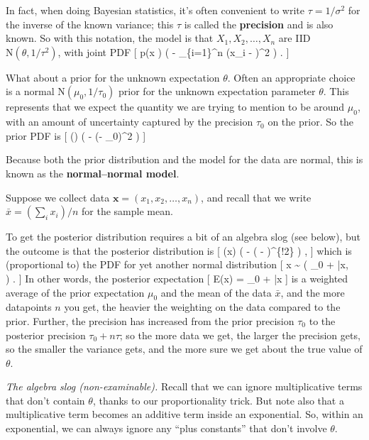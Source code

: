 \documentclass[
  letterpaper,
]{report}
\theoremstyle{definition}
\theoremstyle{definition}
\theoremstyle{remark}
\begin{document}
In fact, when doing Bayesian statistics, it's often convenient to write
\(\tau = 1/\sigma^2\) for the inverse of the known variance; this
\(\tau\) is called the \textbf{precision} and is also known. So with
this notation, the model is that \(X_1, X_2, \dots, X_n\) are IID
\(\text{N}(\theta, 1 / \tau^2)\), with joint PDF {[} p(\mathbf x
\mid \theta) \propto \exp \left( -  \sum\_\{i=1\}\^{}n
(x\_i - \theta)\^{}2 \right) . {]}

What about a prior for the unknown expectation \(\theta\). Often an
appropriate choice is a normal \(\text{N}(\mu_0, 1/\tau_0)\) prior for
the unknown expectation parameter \(\theta\). This represents that we
expect the quantity we are trying to mention to be around \(\mu_0\),
with an amount of uncertainty captured by the precision \(\tau_0\) on
the prior. So the prior PDF is {[} \pi(\theta) \propto \exp \left( -
 (\theta - \mu\_0)\^{}2 \right) {]}

Because both the prior distribution and the model for the data are
normal, this is known as the \textbf{normal--normal model}.

Suppose we collect data \(\mathbf x = (x_1, x_2, \dots, x_n)\), and
recall that we write \(\bar x = (\sum_i x_i)/n\) for the sample mean.

To get the posterior distribution requires a bit of an algebra slog (see
below), but the outcome is that the posterior distribution is {[}
\pi(\theta \mid \mathbf x) \propto \exp \left( -
 \left( \theta -
 \right)\^{}\{!2\}
\right) , {]} which is (proportional to) the PDF for yet another normal
distribution {[} \theta \mid \mathbf x \sim {} \left(
 \mu\_0 + 
\bar x, ~ \right) . {]} In other words, the
posterior expectation {[} \mathbb E(\theta \mid \mathbf x) =
 \mu\_0 + 
\bar x {]} is a weighted average of the prior expectation \(\mu_0\) and
the mean of the data \(\bar x\), and the more datapoints \(n\) you get,
the heavier the weighting on the data compared to the prior. Further,
the precision has increased from the prior precision \(\tau_0\) to the
posterior precision \(\tau_0 + n\tau\); so the more data we get, the
larger the precision gets, so the smaller the variance gets, and the
more sure we get about the true value of \(\theta\).

\emph{The algebra slog (non-examinable).} Recall that we can ignore
multiplicative terms that don't contain \(\theta\), thanks to our
proportionality trick. But note also that a multiplicative term becomes
an additive term inside an exponential. So, within an exponential, we
can always ignore any ``plus constants'' that don't involve \(\theta\).
\end{document}
